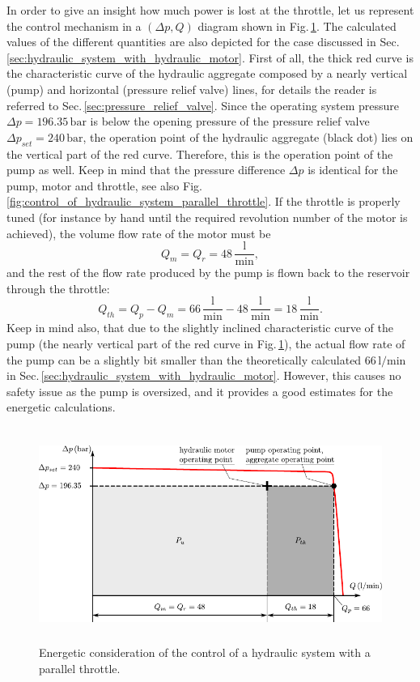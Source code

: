 In order to give an insight how much power is lost at the throttle, let us represent the control mechanism in a $(\Delta p, Q)$ diagram shown in Fig.\,\ref{fig:energy_efficiency_parallel_throttle}. The calculated values of the different quantities are also depicted for the case discussed in Sec.\,\ref{sec:hydraulic_system_with_hydraulic_motor}. First of all, the thick red curve is the characteristic curve of the hydraulic aggregate composed by a nearly vertical (pump) and horizontal (pressure relief valve) lines, for details the reader is referred to Sec.\,\ref{sec:pressure_relief_valve}. Since the operating system pressure $\Delta p=196.35\,\mathrm{bar}$ is below the opening pressure of the pressure relief valve $\Delta p_{set}=240\,\mathrm{bar}$, the operation point of the hydraulic aggregate (black dot) lies on the vertical part of the red curve. Therefore, this is the operation point of the pump as well. Keep in mind that the pressure difference $\Delta p$ is identical for the pump, motor and throttle, see also Fig.\,\ref{fig:control_of_hydraulic_system_parallel_throttle}. If the throttle is properly tuned (for instance by hand until the required revolution number of the motor is achieved), the volume flow rate of the motor must be
%
\begin{equation}
Q_m = Q_r = 48\,\mathrm{\frac{l}{min}},
\end{equation}
%
and the rest of the flow rate produced by the pump is flown back to the reservoir through the throttle:
%
\begin{equation}
Q_{th} = Q_p - Q_m = 66\,\mathrm{\frac{l}{min}} - 48\,\mathrm{\frac{l}{min}} = 18\,\mathrm{\frac{l}{min}}.
\end{equation}
%
Keep in mind also, that due to the slightly inclined characteristic curve of the pump (the nearly vertical part of the red curve in Fig.\,\ref{fig:energy_efficiency_parallel_throttle}), the actual flow rate of the pump can be a slightly bit smaller than the theoretically calculated $66\,\mathrm{l/min}$ in Sec.\,\ref{sec:hydraulic_system_with_hydraulic_motor}. However, this causes no safety issue as the pump is oversized, and it provides a good estimates for the energetic calculations.

\begin{figure}[ht!]
	\centering
		\includegraphics[height=7cm]{PositiveDisplacementPumps/Figures/Energy_Efficiency_Parallel_Throttle.pdf}
	\caption{Energetic consideration of the control of a hydraulic system with a parallel throttle.}
	\label{fig:energy_efficiency_parallel_throttle}
\end{figure}

